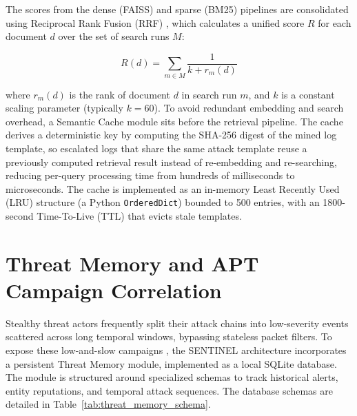 The scores from the dense (FAISS) and sparse (BM25) pipelines are consolidated using Reciprocal Rank Fusion (RRF) \cite{rrf2009}, which calculates a unified score $R$ for each document $d$ over the set of search runs $M$:

\begin{equation}
    R(d) = \sum_{m \in M} \frac{1}{k + r_m(d)}
\end{equation}

where $r_m(d)$ is the rank of document $d$ in search run $m$, and $k$ is a constant scaling parameter (typically $k=60$). To avoid redundant embedding and search overhead, a Semantic Cache module sits before the retrieval pipeline. The cache derives a deterministic key by computing the SHA-256 digest of the mined log template, so escalated logs that share the same attack template reuse a previously computed retrieval result instead of re-embedding and re-searching, reducing per-query processing time from hundreds of milliseconds to microseconds. The cache is implemented as an in-memory Least Recently Used (LRU) structure (a Python \texttt{OrderedDict}) bounded to 500 entries, with an 1800-second Time-To-Live (TTL) that evicts stale templates.

\section{Threat Memory and APT Campaign Correlation}

Stealthy threat actors frequently split their attack chains into low-severity events scattered across long temporal windows, bypassing stateless packet filters. To expose these low-and-slow campaigns \cite{apt_stealth2021}, the SENTINEL architecture incorporates a persistent Threat Memory module, implemented as a local SQLite database. The module is structured around specialized schemas to track historical alerts, entity reputations, and temporal attack sequences. The database schemas are detailed in Table~\ref{tab:threat_memory_schema}.

